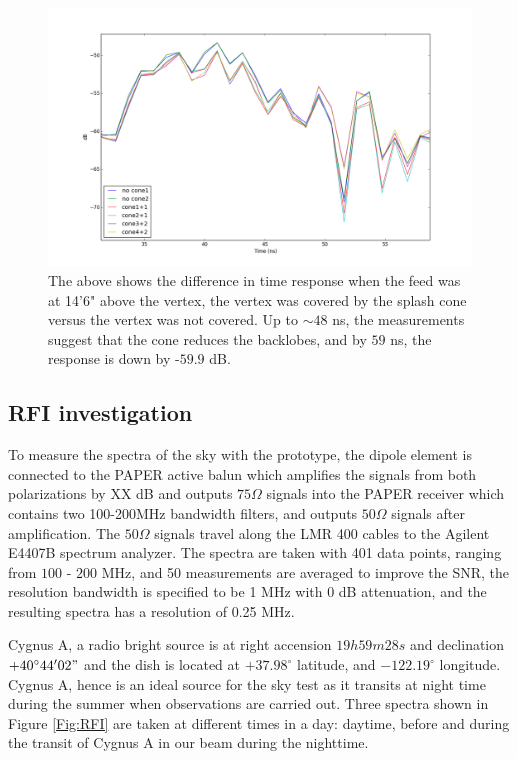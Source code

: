 \documentclass[preprint]{aastex}  %
\begin{document}
\begin{figure}[H]
	\begin{center}
	\includegraphics[width =.7\textwidth]{reflectometry_plots/May5/S11_cone_effect}
	\caption{The above shows the difference in time response when the feed was at 14'6" 
above the vertex, the vertex was covered by the splash cone versus the vertex was not covered.  
Up to $\sim 48$ ns, the measurements suggest that the cone reduces the backlobes, and by 
$59$ ns, the response is down by -$59.9$ dB.  
\label{Fig:conetest} }
	\end{center}
\end{figure}
\clearpage
\subsection{RFI investigation}
To measure the spectra of the sky with the prototype, the dipole element is connected to the PAPER active balun which amplifies the signals from both polarizations by XX dB and outputs $75\Omega$ signals into the PAPER receiver which contains two 100-200MHz bandwidth filters, and outputs $50\Omega$ signals after amplification. The $50\Omega$ signals travel along the LMR 400 cables to the Agilent E4407B spectrum analyzer. The spectra are taken with 401 data points, ranging from $100$ - $200$ MHz, and 50 measurements are averaged to improve the SNR, the resolution bandwidth is specified to be 1 MHz with 0 dB attenuation, and the resulting spectra has a resolution of 0.25 MHz.

Cygnus A, a radio bright source is at right accension $19h59m28s$ and declination $+40^\circ44'02"$ and the dish is located at $+37.98^\circ$ latitude, and $-122.19^\circ$ longitude. Cygnus A, hence is an ideal source for the sky test as it transits at night time during the summer when observations are carried out. Three spectra shown in Figure \ref{Fig:RFI} are taken at different times in a day: daytime, before and during the transit of Cygnus A in our beam during the nighttime.
\end{document}
